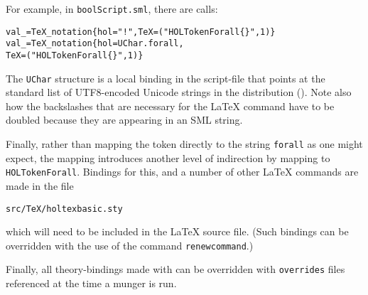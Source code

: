 For example, in \texttt{boolScript.sml}, there are calls:
\begin{alltt}
   val _ = TeX_notation \{ hol = "!", TeX = ("\bs{}\bs{}HOLTokenForall\{\}", 1)\}
   val _ = TeX_notation \{ hol = UChar.forall,
                          TeX = ("\bs{}\bs{}HOLTokenForall\{\}", 1)\}
\end{alltt}
The \texttt{UChar} structure is a local binding in the script-file that points at the standard list of UTF8-encoded Unicode strings in the distribution ().
%
Note also how the backslashes that are necessary for the \LaTeX{} command have to be doubled because they are appearing in an SML string.

Finally, rather than mapping the token directly to the string \texttt{\bs{}forall} as one might expect, the mapping introduces another level of indirection by mapping to \texttt{\bs{}HOLTokenForall}.
%
Bindings for this, and a number of other \LaTeX{} commands are made in the file
\begin{alltt}
   src/TeX/holtexbasic.sty
\end{alltt}
which will need to be included in the \LaTeX{} source file.
%
(Such bindings can be overridden with the use of the command \texttt{\bs{}renewcommand}.)

Finally, all theory-bindings made with  can be overridden with \texttt{overrides} files referenced at the time a munger is run.



